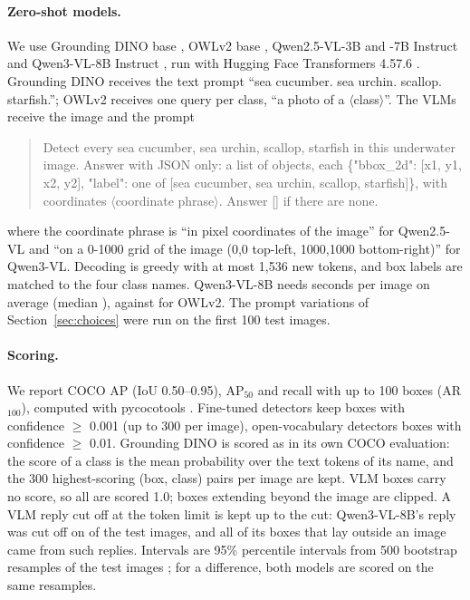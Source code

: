 \documentclass[letterpaper]{article} %
\begin{document}
\paragraph{Zero-shot models.}
We use Grounding DINO base \citep{liu2024grounding}, OWLv2 base \citep{minderer2023scaling}, Qwen2.5-VL-3B and -7B Instruct \citep{bai2025qwen25vl} and Qwen3-VL-8B Instruct \citep{bai2025qwen3vl}, run with Hugging Face Transformers 4.57.6 \citep{wolf2020transformers}. Grounding DINO receives the text prompt ``sea cucumber. sea urchin. scallop. starfish.''; OWLv2 receives one query per class, ``a photo of a $\langle$class$\rangle$''. The VLMs receive the image and the prompt
\begin{quote}\small
Detect every sea cucumber, sea urchin, scallop, starfish in this underwater image. Answer with JSON only: a list of objects, each \{"bbox\_2d": [x1, y1, x2, y2], "label": one of [sea cucumber, sea urchin, scallop, starfish]\}, with coordinates $\langle$coordinate phrase$\rangle$. Answer [] if there are none.
\end{quote}
where the coordinate phrase is ``in pixel coordinates of the image'' for Qwen2.5-VL and ``on a 0-1000 grid of the image (0,0 top-left, 1000,1000 bottom-right)'' for Qwen3-VL. Decoding is greedy with at most 1,536 new tokens, and box labels are matched to the four class names. Qwen3-VL-8B needs \secQwenVLmean{} seconds per image on average (median \secQwenVLmedian), against \secOWL{} for OWLv2. The prompt variations of Section~\ref{sec:choices} were run on the first 100 test images.

\paragraph{Scoring.}
We report COCO AP (IoU 0.50--0.95), AP$_{50}$ and recall with up to 100 boxes (AR$_{100}$), computed with pycocotools \citep{lin2014coco}. Fine-tuned detectors keep boxes with confidence $\geq$ 0.001 (up to 300 per image), open-vocabulary detectors boxes with confidence $\geq$ 0.01. Grounding DINO is scored as in its own COCO evaluation: the score of a class is the mean probability over the text tokens of its name, and the 300 highest-scoring (box, class) pairs per image are kept. VLM boxes carry no score, so all are scored 1.0; boxes extending beyond the image are clipped. A VLM reply cut off at the token limit is kept up to the cut: Qwen3-VL-8B's reply was cut off on \nCutQwenVL{} of the \nTestImages{} test images, and all \nOutsideQwenVL{} of its boxes that lay outside an image came from such replies. Intervals are 95\% percentile intervals from 500 bootstrap resamples of the test images \citep{efron1994introduction}; for a difference, both models are scored on the same resamples.
\end{document}

